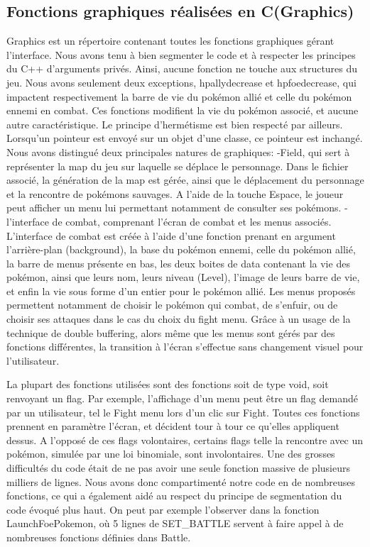 \documentclass[a4paper,twoside, openany,11pt]{book}
\begin{document}
\subsection{Fonctions graphiques réalisées en C(Graphics)}
Graphics est un répertoire contenant toutes les fonctions graphiques gérant l'interface. Nous avons tenu à bien segmenter le code et à respecter les principes du C++ d'arguments privés. Ainsi, aucune fonction ne touche aux structures du jeu. Nous avons seulement deux exceptions, hpallydecrease et hpfoedecrease, qui impactent respectivement la barre de vie du pokémon allié et celle du pokémon ennemi en combat. Ces fonctions modifient la vie du pokémon associé, et aucune autre caractéristique. Le principe d'hermétisme est bien respecté par ailleurs. Lorsqu'un pointeur est envoyé sur un objet d'une classe, ce pointeur est inchangé.
Nous avons distingué deux principales natures de graphiques:
-Field, qui sert à représenter la map du jeu sur laquelle se déplace le personnage. Dans le fichier associé, la génération de la map est gérée, ainsi que le déplacement du personnage et la rencontre de pokémons sauvages. A l'aide de la touche Espace, le joueur peut afficher un menu lui permettant notamment de consulter ses pokémons.
-l'interface de combat, comprenant l'écran de combat et les menus associés. L'interface de combat est créée à l'aide d'une fonction prenant en argument l'arrière-plan (background), la base du pokémon ennemi, celle du pokémon allié, la barre de menus présente en bas, les deux boites de data contenant la vie des pokémon, ainsi que leurs nom, leurs niveau (Level), l'image de leurs barre de vie, et enfin la vie sous forme d'un entier pour le pokémon allié.
Les menus proposés permettent notamment de choisir le pokémon qui combat, de s'enfuir, ou de choisir ses attaques dans le cas du choix du fight menu. Grâce à un usage de la technique de double buffering, alors même que les menus sont gérés par des fonctions différentes, la transition à l'écran s'effectue sans changement visuel pour l'utilisateur.

La plupart des fonctions utilisées sont des fonctions soit de type void, soit renvoyant un flag. Par exemple, l'affichage d'un menu peut être un flag demandé par un utilisateur, tel le Fight menu lors d'un clic sur Fight. Toutes ces fonctions prennent en paramètre l'écran, et décident tour à tour ce qu'elles appliquent dessus. A l'opposé de ces flags volontaires, certains flags telle la rencontre avec un pokémon, simulée par une loi binomiale, sont involontaires.
Une des grosses difficultés du code était de ne pas avoir une seule fonction massive de plusieurs milliers de lignes. Nous avons donc compartimenté notre code en de nombreuses fonctions, ce qui a également aidé au respect du principe de segmentation du code évoqué plus haut. On peut par exemple l'observer dans la fonction LaunchFoePokemon, où 5 lignes de SET\_BATTLE servent à faire appel à de nombreuses fonctions définies dans Battle.
\end{document}
